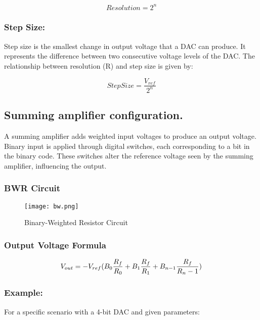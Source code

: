\documentclass{article}
\begin{document}
\begin{equation}
Resolution = 2^n
\end{equation}

\subsubsection{Step Size:}

Step size is the smallest change in output voltage that a DAC can produce.
It represents the difference between two consecutive voltage levels of the DAC.
The relationship between resolution (R) and step size 
is given by: 

\begin{equation}
Step Size = \frac{V_{ref}}{2^n}
\end{equation}
\newpage
\subsection{\textbf{Summing amplifier configuration.}}
A summing amplifier adds weighted input voltages to produce an output voltage.
Binary input is applied through digital switches, each corresponding to a bit in the binary code.
These switches alter the reference voltage seen by the summing amplifier, influencing the output.

\subsubsection{BWR Circuit}

\begin{figure}[htbp]
    \centering
    \texttt{[image: bw.png]}
    \caption{Binary-Weighted Resistor Circuit}
    \label{fig:enter-label}
\end{figure}

\subsubsection{Output Voltage Formula}

\begin{equation}
\fontsize{10}{6}\selectfont
V_{out} = - V_{ref}(B_0 \frac{R_f}{R_0} + B_1 \frac{R_f}{R_1} + B_{n-1} \frac{R_f}{R_n-1})
\end{equation}

\subsubsection{Example:}
For a specific scenario with a 4-bit DAC and given parameters:
\end{document}
